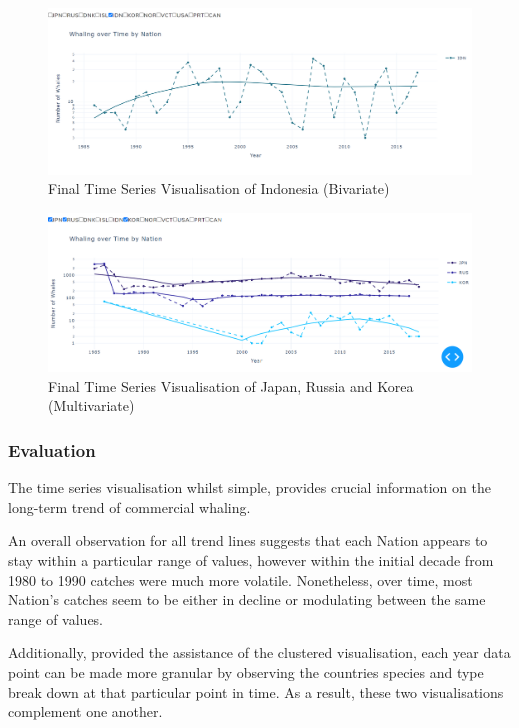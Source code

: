 \documentclass[12pt,a4paper]{article}
\begin{document}
\begin{figure}[H]
    \centering
    \includegraphics[width = 15cm]{SingleTrend.png}
    \caption{Final Time Series Visualisation of Indonesia (Bivariate)}
    \label{fig:my_label}
\end{figure}



\begin{figure}[H]
    \centering
    \includegraphics[width = 15cm]{MultiVariateTrend.png}
    \caption{Final Time Series Visualisation of Japan, Russia and Korea (Multivariate)}
    \label{fig:my_label}
\end{figure}

 


\subsubsection{Evaluation}
 The time series visualisation whilst simple, provides crucial information on the long-term trend of commercial whaling. 
 
 An overall observation for all trend lines suggests that each Nation appears to stay within a particular range of values, however within the initial decade from 1980 to 1990 catches were much more volatile.  Nonetheless, over time, most Nation's catches seem to be either in decline or modulating between the same range of values. 

 
 Additionally, provided the assistance of the clustered visualisation, each year data point can be made more granular by observing the countries species and type break down at that particular point in time. As a result, these two visualisations complement one another. 
\end{document}
